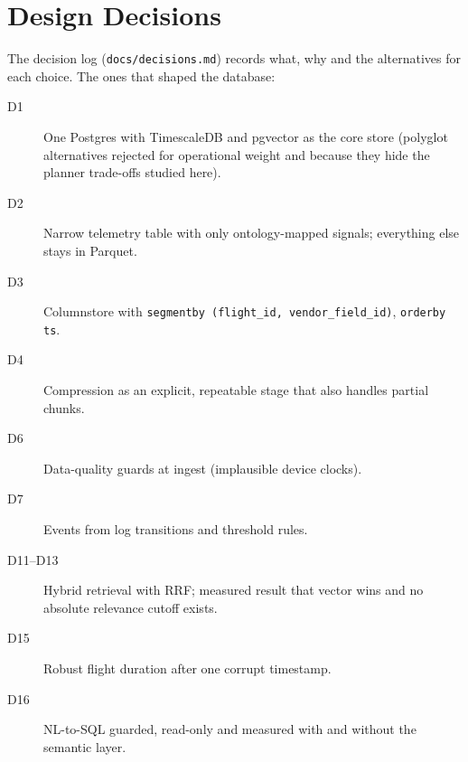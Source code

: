 \documentclass[11pt,a4paper]{article}
\newcommand{\code}[1]{\texttt{#1}}
\begin{document}
\section{Design Decisions}
The decision log (\code{docs/decisions.md}) records what, why and the alternatives for each choice. The ones that shaped the database:
\begin{description}
  \item[D1] One Postgres with TimescaleDB and pgvector as the core store (polyglot alternatives rejected for operational weight and because they hide the planner trade-offs studied here).
  \item[D2] Narrow telemetry table with only ontology-mapped signals; everything else stays in Parquet.
  \item[D3] Columnstore with \code{segmentby (flight\_id, vendor\_field\_id)}, \code{orderby ts}.
  \item[D4] Compression as an explicit, repeatable stage that also handles partial chunks.
  \item[D6] Data-quality guards at ingest (implausible device clocks).
  \item[D7] Events from log transitions and threshold rules.
  \item[D11--D13] Hybrid retrieval with RRF; measured result that vector wins and no absolute relevance cutoff exists.
  \item[D15] Robust flight duration after one corrupt timestamp.
  \item[D16] NL-to-SQL guarded, read-only and measured with and without the semantic layer.
\end{description}

\end{document}
